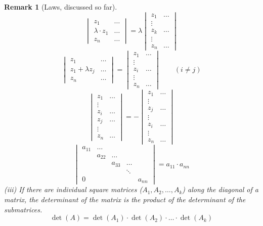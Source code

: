 \documentclass{article}
\newtheorem{remark}{Remark}  \numberwithin{remark}{section}
\begin{document}
\begin{remark}[Laws, discussed so far]
  \[
    \begin{vmatrix}
      z_1 & \ldots \\
      \lambda \cdot z_1 & \ldots \\
      z_n & \ldots
    \end{vmatrix}
    = \lambda \begin{vmatrix}
      z_1 & \ldots \\
      \vdots & \\
      z_k & \ldots \\
      \vdots & \\
      z_n & \ldots
    \end{vmatrix}
  \] \[
    \begin{vmatrix}
      z_1 & \ldots \\
      z_1 + \lambda z_j & \ldots \\
      z_n & \ldots
    \end{vmatrix}
    = \begin{vmatrix}
      z_1 & \ldots \\
      \vdots & \\
      z_i & \ldots \\
      \vdots & \\
      z_n & \ldots
    \end{vmatrix}
    \qquad (i \neq j)
  \] \[
    \begin{vmatrix}
      z_1 & \ldots \\
      \vdots & \\
      z_i & \ldots \\
      z_j & \ldots \\
      \vdots & \\
      z_n & \ldots
    \end{vmatrix}
    = -\begin{vmatrix}
      z_1 & \ldots \\
      \vdots & \\
      z_j & \ldots \\
      \vdots & \\
      z_i & \ldots \\
      \vdots & \\
      z_n & \ldots
    \end{vmatrix}
  \] \[
    \begin{vmatrix}
      a_{11} & \ldots &        &        & \\
             & a_{22} & \ldots &        & \\
             &        & a_{33} & \ldots & \\
             &        &        & \ddots & \\
           0 &        &        &        & a_{nn}
    \end{vmatrix}
    = a_{11} \cdot a_{nn}
  \]
  (iii) If there are individual square matrices ($A_1, A_2, \dots, A_k$) along the diagonal of a matrix,
  the determinant of the matrix is the product of the determinant of the submatrices.
  \[ \det(A) = \det(A_1) \cdot \det(A_2) \cdot \ldots \cdot \det(A_k) \]
\end{remark}
\end{document}
